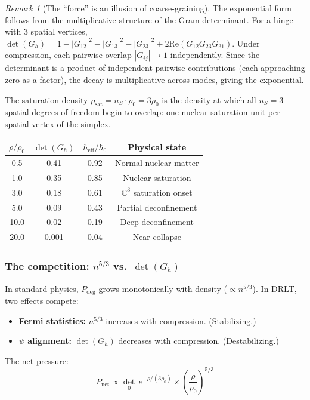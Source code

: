 \documentclass[12pt]{article}
\theoremstyle{remark}
\newtheorem{remark}[theorem]{Remark}
\theoremstyle{definition}
\newcommand{\CC}{\mathbb{C}}
\begin{document}
\begin{remark}[The ``force'' is an illusion of coarse-graining]
The exponential form follows from the multiplicative structure of the Gram determinant. For a hinge with 3 spatial vertices, $\det(G_h) = 1 - |G_{12}|^2 - |G_{13}|^2 - |G_{23}|^2 + 2\text{Re}(G_{12}G_{23}G_{31})$. Under compression, each pairwise overlap $|G_{ij}| \to 1$ independently. Since the determinant is a product of independent pairwise contributions (each approaching zero as a factor), the decay is multiplicative across modes, giving the exponential.

The saturation density $\rho_\text{sat} = n_S \cdot \rho_0 = 3\rho_0$ is the density at which all $n_S = 3$ spatial degrees of freedom begin to overlap: one nuclear saturation unit per spatial vertex of the simplex.

\begin{center}
\begin{tabular}{cccc}
\hline
$\rho/\rho_0$ & $\det(G_h)$ & $\hbar_\text{eff}/\hbar_0$ & Physical state \\
\hline
0.5 & 0.41 & 0.92 & Normal nuclear matter \\
1.0 & 0.35 & 0.85 & Nuclear saturation \\
3.0 & 0.18 & 0.61 & $\CC^3$ saturation onset \\
5.0 & 0.09 & 0.43 & Partial deconfinement \\
10.0 & 0.02 & 0.19 & Deep deconfinement \\
20.0 & 0.001 & 0.04 & Near-collapse \\
\hline
\end{tabular}
\end{center}

\subsubsection{The competition: $n^{5/3}$ vs.\ $\det(G_h)$}

In standard physics, $P_\text{deg}$ grows monotonically with density ($\propto n^{5/3}$). In DRLT, two effects compete:
\begin{itemize}
\item \textbf{Fermi statistics:} $n^{5/3}$ increases with compression. (Stabilizing.)
\item \textbf{$\psi$ alignment:} $\det(G_h)$ decreases with compression. (Destabilizing.)
\end{itemize}

The net pressure:
\begin{equation}
P_\text{net} \propto \det_0\,e^{-\rho/(3\rho_0)} \times \left(\frac{\rho}{\rho_0}\right)^{5/3}
\end{equation}


\end{remark}
\end{document}
